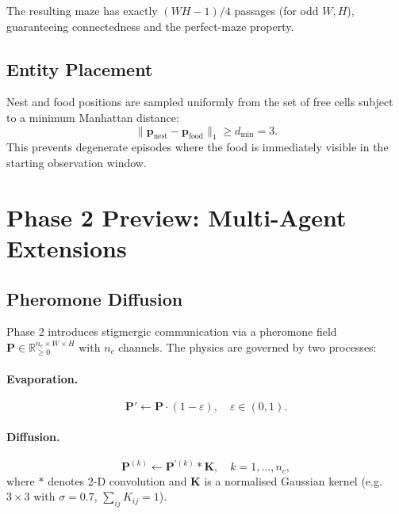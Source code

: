 \documentclass[11pt,a4paper]{article}
\newcommand{\R}{\mathbb{R}}
\begin{document}
The resulting maze has exactly $(WH - 1)/4$ passages (for odd $W, H$),
guaranteeing connectedness and the perfect-maze property.

\subsection{Entity Placement}

Nest and food positions are sampled uniformly from the set of free cells
subject to a minimum Manhattan distance:
\begin{equation}
  \|\mathbf{p}_{\text{nest}} - \mathbf{p}_{\text{food}}\|_1 \ge d_{\min} = 3.
\end{equation}
This prevents degenerate episodes where the food is immediately visible
in the starting observation window.

\section{Phase 2 Preview: Multi-Agent Extensions}

\subsection{Pheromone Diffusion}

Phase 2 introduces stigmergic communication via a pheromone field
$\mathbf{P} \in \R^{n_c \times W \times H}_{\ge 0}$ with $n_c$ channels.
The physics are governed by two processes:

\paragraph{Evaporation.}
\begin{equation}
  \mathbf{P}' \leftarrow \mathbf{P} \cdot (1 - \varepsilon),
  \quad \varepsilon \in (0,1).
\end{equation}

\paragraph{Diffusion.}
\begin{equation}
  \mathbf{P}^{(k)} \leftarrow \mathbf{P}^{\prime(k)} * \mathbf{K},
  \quad k = 1, \ldots, n_c,
\end{equation}
where $*$ denotes 2-D convolution and $\mathbf{K}$ is a normalised Gaussian kernel
(e.g.\ $3\times3$ with $\sigma = 0.7$, $\sum_{ij} K_{ij} = 1$).
\end{document}
